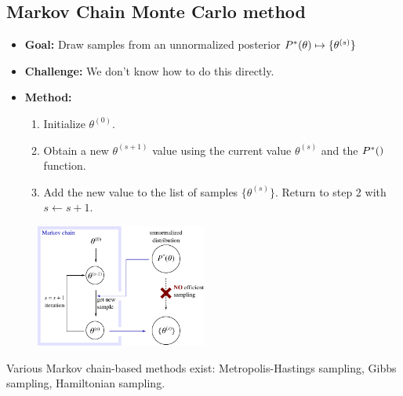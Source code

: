 \subsection{Markov Chain Monte Carlo method}
\begin{itemize}
	\item {\bf Goal:} Draw samples from an unnormalized posterior $P^\ast(\theta) \mapsto \{\theta^{(s)}\}$
	\item {\bf Challenge:} We don't know how to do this directly.
	\item {\bf Method:}
	\begin{enumerate}
		\item Initialize $\theta^{(0)}$.
		\item Obtain a new $\theta^{(s+1)}$ value using the current value $\theta^{(s)}$ and the $P^\ast()$ function.
		\item Add the new value to the list of samples $\{\theta^{(s)}\}$. Return to step 2 with $s \leftarrow s+1$.
	\end{enumerate}
\end{itemize}
\begin{figure}[h]
\centering
	\includegraphics[width=0.5\textwidth]{./figs/07-MCMC.pdf}
\end{figure}
Various Markov chain-based methods exist: Metropolis-Hastings sampling, Gibbs sampling, Hamiltonian sampling.

